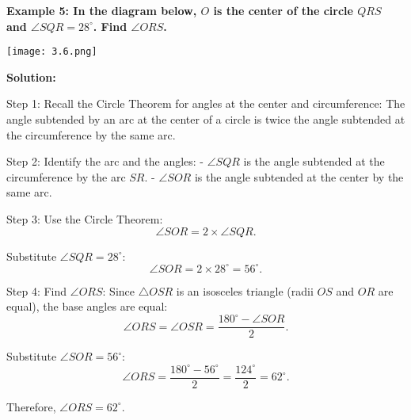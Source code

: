 \begin{flushleft}
	\textbf{Example 5: In the diagram below, $O$ is the center of the circle $QRS$ and $\angle SQR = 28^\circ$. Find $\angle ORS$.}
	
	\vspace{0.5cm}
	\begin{center}
		\texttt{[image: 3.6.png]}
	\end{center}
	
	\textbf{Solution:}
	\vspace{0.5cm}
	
	Step 1: Recall the Circle Theorem for angles at the center and circumference:
	The angle subtended by an arc at the center of a circle is twice the angle subtended at the circumference by the same arc.
	
	Step 2: Identify the arc and the angles:
	- $\angle SQR$ is the angle subtended at the circumference by the arc $SR$.
	- $\angle SOR$ is the angle subtended at the center by the same arc.
	
	Step 3: Use the Circle Theorem:
	\[
	\angle SOR = 2 \times \angle SQR.
	\]
	
	Substitute $\angle SQR = 28^\circ$:
	\[
	\angle SOR = 2 \times 28^\circ = 56^\circ.
	\]
	
	Step 4: Find $\angle ORS$:
	Since $\triangle OSR$ is an isosceles triangle (radii $OS$ and $OR$ are equal), the base angles are equal:
	\[
	\angle ORS = \angle OSR = \frac{180^\circ - \angle SOR}{2}.
	\]
	
	Substitute $\angle SOR = 56^\circ$:
	\[
	\angle ORS = \frac{180^\circ - 56^\circ}{2} = \frac{124^\circ}{2} = 62^\circ.
	\]
	
	Therefore, $\angle ORS = 62^\circ$.
\end{flushleft}

